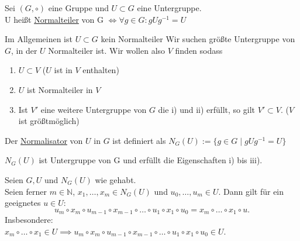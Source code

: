 \documentclass[a4paper]{article}
\newcommand{\N}{\mathbb{N}}
\begin{document}
\thispagestyle{ErsteSeite} 
\begin{center}
\end{center}
\hspace{10mm}
\begin{definition}[1.1]
        Sei $(G, \circ)$ eine Gruppe und $U \subset G$ eine Untergruppe. \\
        U heißt \underline{Normalteiler} von G $\iff \forall g \in G: g U g^{-1} = U $
\end{definition}

\begin{bemerkung}
Im Allgemeinen ist $U \subset G$ kein Normalteiler Wir suchen größte Untergruppe von $G$, in der $U$ Normalteiler ist. Wir wollen also $V$ finden sodass
\begin{enumerate}
        \item $U \subset V$ ($U$ ist in $V$ enthalten)
        \item $U$ ist Normalteiler in $V$
        \item Ist $V'$ eine weitere Untergruppe von $G$ die i) und ii) erfüllt, so gilt $V' \subset V$. ($V$ ist größtmöglich)
    \end{enumerate}
\end{bemerkung}

\begin{definition}[2.2]
        Der \underline{Normalisator} von $U$ in $G$ ist definiert als 
          $N_G(U) := \{g \in G  \mid g U g^{-1} = U\}$
\end{definition}
\begin{satz}[2.3]
        $N_G(U)$ ist Untergruppe von G und erfüllt die Eigenschaften i) bis iii).
    \end{satz}

\begin{satz}[2.4]
        Seien $G, U$ und $N_G(U)$ wie gehabt. \\
        Seien ferner $m \in \N$, $x_1, \ldots, x_m \in N_G(U)$ und $u_0, \ldots, u_m \in U$. Dann gilt für ein geeignetes $u \in U$:
        \[
            u_m \circ x_m \circ u_{m-1} \circ x_{m-1} \circ \ldots \circ u_1 \circ x_1 \circ u_0 = x_m \circ \ldots \circ  x_1 \circ u
        .\] 
        Insbesondere: \\
        $x_m \circ \ldots \circ x_1 \in U \implies u_m \circ x_m \circ u_{m-1} \circ x_{m-1} \circ \ldots \circ u_1 \circ x_1 \circ u_0 \in U$.
    \end{satz}
\end{document}
